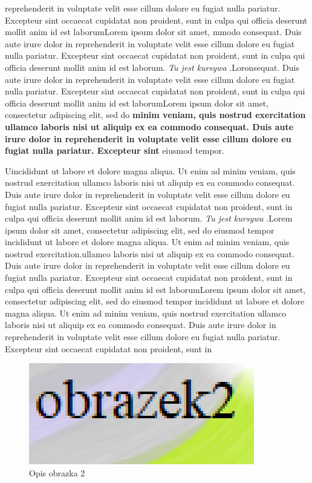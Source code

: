 \documentclass[12pt,a4paper,titlepage]{article}
\begin{document}
reprehenderit in voluptate velit esse cillum dolore eu fugiat nulla pariatur. Excepteur sint occaecat cupidatat non proident, sunt in culpa qui officia deserunt mollit anim id est laborumLorem ipsum dolor sit amet, mmodo consequat. Duis aute irure dolor in reprehenderit in voluptate velit esse cillum dolore eu fugiat nulla pariatur. Excepteur sint occaecat cupidatat non proident, sunt in culpa qui officia deserunt mollit anim id est laborum.  \textit{Tu jest kursywa} .Loronsequat. Duis aute irure dolor in reprehenderit in voluptate velit esse cillum dolore eu fugiat nulla pariatur. Excepteur sint occaecat cupidatat non proident, sunt in culpa qui officia deserunt mollit anim id est laborumLorem ipsum dolor sit amet, consectetur adipiscing elit, sed do \textbf{minim veniam, quis nostrud exercitation ullamco laboris nisi ut aliquip ex ea commodo consequat. Duis aute irure dolor in reprehenderit in voluptate velit esse cillum dolore eu fugiat nulla pariatur. Excepteur sint} eiusmod tempor. \par Uincididunt ut labore et dolore magna aliqua.  Ut enim ad minim veniam, quis nostrud exercitation ullamco laboris nisi ut aliquip ex ea commodo consequat. Duis aute irure dolor in reprehenderit in voluptate velit esse cillum dolore eu fugiat nulla pariatur. Excepteur sint occaecat cupidatat non proident, sunt in culpa qui officia deserunt mollit anim id est laborum.  \textit{Tu jest kursywa} .Lorem ipsum dolor sit amet, consectetur adipiscing elit, sed do eiusmod tempor incididunt ut labore et dolore magna aliqua. Ut enim ad minim veniam, quis nostrud exercitation.ullamco laboris nisi ut aliquip ex ea commodo consequat. Duis aute irure dolor in reprehenderit in voluptate velit esse cillum dolore eu fugiat nulla pariatur. Excepteur sint occaecat cupidatat non proident, sunt in culpa qui officia deserunt mollit anim id est laborumLorem ipsum dolor sit amet, consectetur adipiscing elit, sed do eiusmod tempor incididunt ut labore et dolore magna aliqua.  Ut enim ad minim veniam, quis nostrud exercitation ullamco laboris nisi ut aliquip ex ea commodo consequat. Duis aute irure dolor in reprehenderit in voluptate velit esse cillum dolore eu fugiat nulla pariatur. Excepteur sint occaecat cupidatat non proident, sunt in 
\begin{figure}[h]
\centering
\includegraphics{obrazek2.png}
\caption{Opis obrazka 2}
\label{fig:obr2}
\end{figure}
\end{document}
